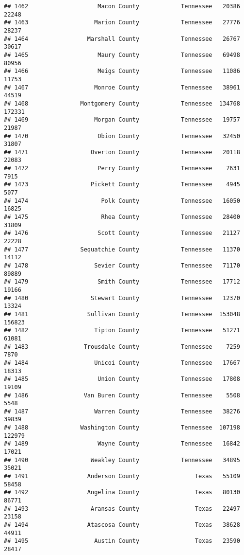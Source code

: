 \documentclass[
]{article}
\begin{document}
\begin{verbatim}
## 1462                    Macon County            Tennessee   20386   22248
## 1463                   Marion County            Tennessee   27776   28237
## 1464                 Marshall County            Tennessee   26767   30617
## 1465                    Maury County            Tennessee   69498   80956
## 1466                    Meigs County            Tennessee   11086   11753
## 1467                   Monroe County            Tennessee   38961   44519
## 1468               Montgomery County            Tennessee  134768  172331
## 1469                   Morgan County            Tennessee   19757   21987
## 1470                    Obion County            Tennessee   32450   31807
## 1471                  Overton County            Tennessee   20118   22083
## 1472                    Perry County            Tennessee    7631    7915
## 1473                  Pickett County            Tennessee    4945    5077
## 1474                     Polk County            Tennessee   16050   16825
## 1475                     Rhea County            Tennessee   28400   31809
## 1476                    Scott County            Tennessee   21127   22228
## 1477               Sequatchie County            Tennessee   11370   14112
## 1478                   Sevier County            Tennessee   71170   89889
## 1479                    Smith County            Tennessee   17712   19166
## 1480                  Stewart County            Tennessee   12370   13324
## 1481                 Sullivan County            Tennessee  153048  156823
## 1482                   Tipton County            Tennessee   51271   61081
## 1483                Trousdale County            Tennessee    7259    7870
## 1484                   Unicoi County            Tennessee   17667   18313
## 1485                    Union County            Tennessee   17808   19109
## 1486                Van Buren County            Tennessee    5508    5548
## 1487                   Warren County            Tennessee   38276   39839
## 1488               Washington County            Tennessee  107198  122979
## 1489                    Wayne County            Tennessee   16842   17021
## 1490                  Weakley County            Tennessee   34895   35021
## 1491                 Anderson County                Texas   55109   58458
## 1492                 Angelina County                Texas   80130   86771
## 1493                  Aransas County                Texas   22497   23158
## 1494                 Atascosa County                Texas   38628   44911
## 1495                   Austin County                Texas   23590   28417

\end{verbatim}
\end{document}
